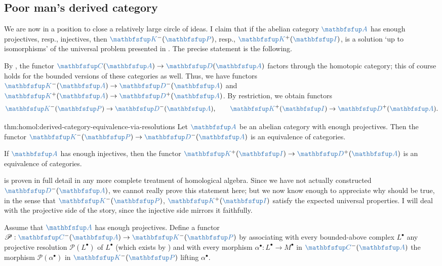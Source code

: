 \subsection{Poor man's derived category}
\label{subsec:homol:poor-man-s-derived-category}

We are now in a position to close a relatively large circle of ideas.
I claim that if the abelian category $\categ{A}$ has enough
projectives, resp., injectives, then $\categ{K}^-(\categ{P})$, resp.,
$\categ{K}^+(\categ{I})$, is a solution `up to isomorphisms' of the
universal problem presented in
. The
precise statement is the following.

By , the functor
$\categ{C}(\categ{A}) \to \categ{D}(\categ{A})$ factors through the
homotopic category; this of course holds for the bounded versions of
these categories as well. Thus, we have functors
$\categ{K}^-(\categ{A}) \to \categ{D}^-(\categ{A})$ and
$\categ{K}^+(\categ{A}) \to \categ{D}^+(\categ{A})$. By restriction,
we obtain functors
\[
  \categ{K}^-(\categ{P}) \to \categ{D}^-(\categ{A}), \qquad
  \categ{K}^+(\categ{I}) \to \categ{D}^+(\categ{A}).
\]

\begin{thm}{}{thm:homol:derived-category-equivalence-via-resolutions}
  Let $\categ{A}$ be an abelian category with enough projectives.
  Then the functor $\categ{K}^-(\categ{P}) \to \categ{D}^-(\categ{A})$
  is an equivalence of categories.

  If $\categ{A}$ has enough injectives, then the functor
  $\categ{K}^+(\categ{I}) \to \categ{D}^+(\categ{A})$ is an
  equivalence of categories.
\end{thm}

 is proven in full detail in any more
complete treatment of homological algebra. Since we have not actually
constructed $\categ{D}^-(\categ{A})$, we cannot really prove this
statement here; but we now know enough to appreciate why
 should be true, in the sense that
$\categ{K}^-(\categ{P})$, $\categ{K}^+(\categ{I})$ satisfy the
expected universal properties. I will deal with the projective side of
the story, since the injective side mirrors it faithfully.

Assume that $\categ{A}$ has enough projectives. Define a functor
$\mathscr{P} : \categ{C}^-(\categ{A}) \to \categ{K}^-(\categ{P})$ by
associating with every bounded-above complex $L^\bullet$ any
projective resolution $\mathscr{P}(L^\bullet)$ of $L^\bullet$ (which
exists by ) and with every morphism
$\alpha^\bullet : L^\bullet \to M^\bullet$ in $\categ{C}^-(\categ{A})$
the morphism $\mathscr{P}(\alpha^\bullet)$ in $\categ{K}^-(\categ{P})$
lifting $\alpha^\bullet$.


